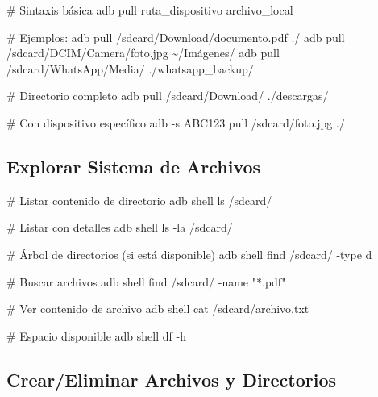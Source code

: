 \documentclass[
  doc,
  floatsintext,
  longtable,
  a4paper,
  nolmodern,
  notxfonts,
  notimes,
  12pt,
  colorlinks=true,linkcolor=blue,citecolor=blue,urlcolor=blue]{apa7}
\newenvironment{Shaded}{\begin{snugshade}}{\end{snugshade}}
\newcommand{\AttributeTok}[1]{\textcolor[rgb]{0.40,0.45,0.13}{#1}}
\newcommand{\CommentTok}[1]{\textcolor[rgb]{0.37,0.37,0.37}{#1}}
\newcommand{\ExtensionTok}[1]{\textcolor[rgb]{0.00,0.23,0.31}{#1}}
\newcommand{\NormalTok}[1]{\textcolor[rgb]{0.00,0.23,0.31}{#1}}
\newcommand{\StringTok}[1]{\textcolor[rgb]{0.13,0.47,0.30}{#1}}
\begin{document}
\begin{Shaded}
\begin{Highlighting}[]
\CommentTok{\# Sintaxis básica}
\ExtensionTok{adb}\NormalTok{ pull ruta\_dispositivo archivo\_local}

\CommentTok{\# Ejemplos:}
\ExtensionTok{adb}\NormalTok{ pull /sdcard/Download/documento.pdf ./}
\ExtensionTok{adb}\NormalTok{ pull /sdcard/DCIM/Camera/foto.jpg \textasciitilde{}/Imágenes/}
\ExtensionTok{adb}\NormalTok{ pull /sdcard/WhatsApp/Media/ ./whatsapp\_backup/}

\CommentTok{\# Directorio completo}
\ExtensionTok{adb}\NormalTok{ pull /sdcard/Download/ ./descargas/}

\CommentTok{\# Con dispositivo específico}
\ExtensionTok{adb} \AttributeTok{{-}s}\NormalTok{ ABC123 pull /sdcard/foto.jpg ./}
\end{Highlighting}
\end{Shaded}

\subsection{Explorar Sistema de
Archivos}\label{explorar-sistema-de-archivos}

\begin{Shaded}
\begin{Highlighting}[]
\CommentTok{\# Listar contenido de directorio}
\ExtensionTok{adb}\NormalTok{ shell ls /sdcard/}

\CommentTok{\# Listar con detalles}
\ExtensionTok{adb}\NormalTok{ shell ls }\AttributeTok{{-}la}\NormalTok{ /sdcard/}

\CommentTok{\# Árbol de directorios (si está disponible)}
\ExtensionTok{adb}\NormalTok{ shell find /sdcard/ }\AttributeTok{{-}type}\NormalTok{ d}

\CommentTok{\# Buscar archivos}
\ExtensionTok{adb}\NormalTok{ shell find /sdcard/ }\AttributeTok{{-}name} \StringTok{"*.pdf"}

\CommentTok{\# Ver contenido de archivo}
\ExtensionTok{adb}\NormalTok{ shell cat /sdcard/archivo.txt}

\CommentTok{\# Espacio disponible}
\ExtensionTok{adb}\NormalTok{ shell df }\AttributeTok{{-}h}
\end{Highlighting}
\end{Shaded}

\subsection{Crear/Eliminar Archivos y
Directorios}\label{creareliminar-archivos-y-directorios}
\end{document}
